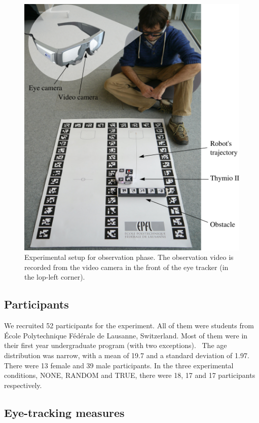 \documentclass{sig-alternate}
\begin{document}
\begin{figure}
    \centering
    \includegraphics[width=0.9\linewidth]{setup}
    \caption{\small Experimental setup for observation phase. The observation
    video is recorded from the video camera in the front of the eye tracker (in
    the lop-left corner).}

    \label{expe}
\end{figure}

\subsection{Participants}

We recruited 52 participants for the experiment. All of them were
students from École Polytechnique Fédérale de Lausanne, Switzerland.
Most of them were in their first year undergraduate program (with two
exceptions). ~The age distribution was narrow, with a mean of 19.7 and a
standard deviation of 1.97. There were 13 female and 39 male
participants. In the three experimental conditions, {\sf NONE}, {\sf RANDOM} and
{\sf TRUE}, there were 18, 17 and 17 participants respectively.

\subsection{Eye-tracking measures}
\end{document}
